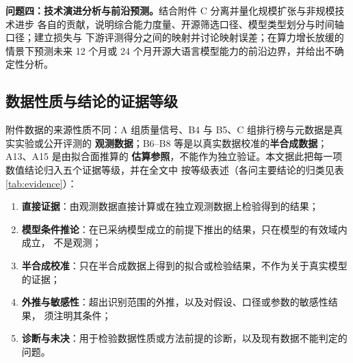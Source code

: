 \textbf{问题四：技术演进分析与前沿预测。}结合附件 C 分离并量化规模扩张与非规模技术进步
各自的贡献，说明综合能力度量、开源筛选口径、模型类型划分与时间轴口径；建立损失与
下游评测得分之间的映射并讨论映射误差；在算力增长放缓的情景下预测未来 12 个月或
24 个月开源大语言模型能力的前沿边界，并给出不确定性分析。

\subsection{数据性质与结论的证据等级}
\label{sec:evidence-classes}

附件数据的来源性质不同：A 组质量信号、B4 与 B5、C 组排行榜与元数据是真实实验或公开评测的
\textbf{观测数据}；B6--B8 等是以真实数据校准的\textbf{半合成数据}；A13、A15 是由拟合面推算的
\textbf{估算参照}，不能作为独立验证。本文据此把每一项数值结论归入五个证据等级，并在全文中
按等级表述（各问主要结论的归类见表\ref{tab:evidence}）：
\begin{enumerate}[label=\Alph*.]
  \item \textbf{直接证据}：由观测数据直接计算或在独立观测数据上检验得到的结果；
  \item \textbf{模型条件推论}：在已采纳模型成立的前提下推出的结果，只在模型的有效域内成立，
        不是观测；
  \item \textbf{半合成校准}：只在半合成数据上得到的拟合或检验结果，不作为关于真实模型的证据；
  \item \textbf{外推与敏感性}：超出识别范围的外推，以及对假设、口径或参数的敏感性结果，
        须注明其条件；
  \item \textbf{诊断与未决}：用于检验数据性质或方法前提的诊断，以及现有数据不能判定的问题。
\end{enumerate}

